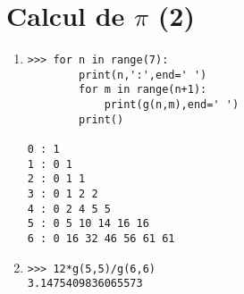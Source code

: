 \documentclass[11pt,a4paper]{article}
\begin{document}
\section{Calcul de $\pi$ (2)}
%

\begin{minipage}[t]{7cm}
\begin{enumerate}
\item 
\begin{Verbatim}
>>> for n in range(7):
        print(n,':',end=' ')
        for m in range(n+1):
            print(g(n,m),end=' ')
        print()

0 : 1 
1 : 0 1 
2 : 0 1 1 
3 : 0 1 2 2 
4 : 0 2 4 5 5 
5 : 0 5 10 14 16 16 
6 : 0 16 32 46 56 61 61 
\end{Verbatim}
\end{enumerate}
\end{minipage}
\hfill
\begin{minipage}[t]{7cm}
\begin{enumerate}\setcounter{enumi}{1}
\item  
\begin{Verbatim}
>>> 12*g(5,5)/g(6,6)
3.1475409836065573

\end{Verbatim}
\end{enumerate}
\end{minipage}

\label{fini}
\end{document}
